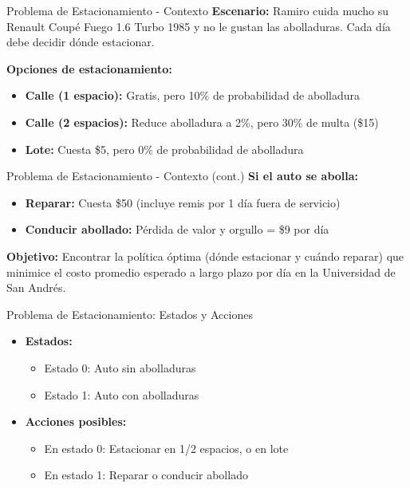 \documentclass{beamer}
\begin{document}

\begin{frame}{Problema de Estacionamiento - Contexto}
    \small
    \textbf{Escenario:} Ramiro cuida mucho su Renault Coupé Fuego 1.6 Turbo 1985 y no le gustan las abolladuras. Cada día debe decidir dónde estacionar.

    \textbf{Opciones de estacionamiento:}
    \begin{itemize}
        \item \textbf{Calle (1 espacio):} Gratis, pero 10\% de probabilidad de abolladura
        \item \textbf{Calle (2 espacios):} Reduce abolladura a 2\%, pero 30\% de multa (\$15)
        \item \textbf{Lote:} Cuesta \$5, pero 0\% de probabilidad de abolladura
    \end{itemize}
\end{frame}

\begin{frame}{Problema de Estacionamiento - Contexto (cont.)}
    \small
    \textbf{Si el auto se abolla:}
    \begin{itemize}
        \item \textbf{Reparar:} Cuesta \$50 (incluye remis por 1 día fuera de servicio)
        \item \textbf{Conducir abollado:} Pérdida de valor y orgullo = \$9 por día
    \end{itemize}

    \vspace{1em}

    \textbf{Objetivo:} Encontrar la política óptima (dónde estacionar y cuándo reparar) que minimice el costo promedio esperado a largo plazo por día en la Universidad de San Andrés.
\end{frame}

\begin{frame}{Problema de Estacionamiento: Estados y Acciones}
    \begin{itemize}
        \item \textbf{Estados:}
        \begin{itemize}
            \item Estado 0: Auto sin abolladuras
            \item Estado 1: Auto con abolladuras
        \end{itemize}

        \vspace{1em}

        \item \textbf{Acciones posibles:}
        \begin{itemize}
            \item En estado 0: Estacionar en 1/2 espacios, o en lote
            \item En estado 1: Reparar o conducir abollado
        \end{itemize}
    \end{itemize}
\end{frame}
\end{document}
